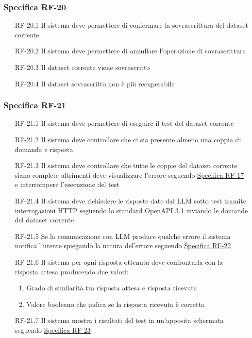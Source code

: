 \subsubsection{Specifica RF-20}
\label{subsubsec:RF-20}
\begin{enumerate}
    \item[RF-20.1] Il sistema deve permettere di confermare la sovrascrittura del dataset corrente
    \item[RF-20.2] Il sistema deve permettere di annullare l'operazione di sovrascrittura
    \item[RF-20.3] Il dataset corrente viene sovrascritto 
    \item[RF-20.4] Il dataset sovrascritto non è più recuperabile
\end{enumerate}

\subsubsection{Specifica RF-21}
\label{subsubsec:RF-21}
\begin{enumerate}
    \item[RF-21.1] Il sistema deve permettere di eseguire il test del dataset corrente
    \item[RF-21.2] Il sistema deve controllare che ci sia presente almeno una coppia di domanda e risposta
    \item[RF-21.3] Il sistema deve controllare che tutte le coppie del dataset corrente siano complete altrimenti deve visualizzare l'errore seguendo \hyperref[subsubsec:RF-17]{Specifica RF-17} e interrompere l'esecuzione del test
    \item[RF-21.4] Il sistema deve richiedere le risposte date dal LLM sotto test tramite interrogazioni HTTP seguendo lo standard OpenAPI 3.1 inviando le domande del dataset corrente
    \item[RF-21.5] Se la comunicazione con LLM produce qualche errore il sistema notifica l'utente spiegando la natura del'errore seguendo \hyperref[subsubsec:RF-22]{Specifica RF-22}
    \item[RF-21.6] Il sistema per ogni risposta ottenuta deve confrontarla con la risposta attesa producendo due valori:
    \begin{enumerate}
        \item Grado di similarità tra risposta attesa e risposta ricevuta
        \item Valore booleano che indica se la risposta ricevuta è corretta
    \end{enumerate}
    \item[RF-21.7] Il sistema mostra i risultati del test in un'apposita schermata seguendo \hyperref[subsubsec:RF-23]{Specifica RF-23}
\end{enumerate}

